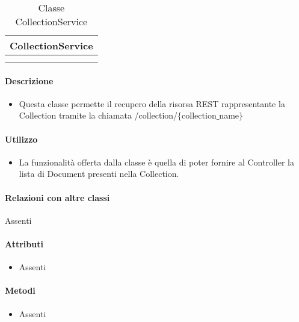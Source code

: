 \begin{table}[ht]
\begin{center}
\bgroup
\setlength{\arrayrulewidth}{0.6mm}
\def\arraystretch{1}
\begin{tabular}{ | p{12cm} | }
\hline
\centerline{\textbf{CollectionService}}
\\ \hline
 \\ 
\hline
 \\ 
\hline
\end{tabular}
\egroup
\caption{Classe CollectionService}
\end{center}
\end{table}

\paragraph*{Descrizione}
\begin{itemize}
\item[] Questa classe permette il recupero della risorsa REST rappresentante la Collection tramite la chiamata  /collection/$\{$collection$\_$name$\}$
\end{itemize}

\paragraph*{Utilizzo}
\begin{itemize}
\item[] La  funzionalità offerta dalla classe è quella di poter fornire al Controller la lista di Document presenti nella Collection.
\end{itemize}

\paragraph*{Relazioni con altre classi}
Assenti

\paragraph*{Attributi}
\begin{itemize}
\item[] Assenti
\end{itemize}

\paragraph*{Metodi}
\begin{itemize}
\item[] Assenti
\end{itemize}

